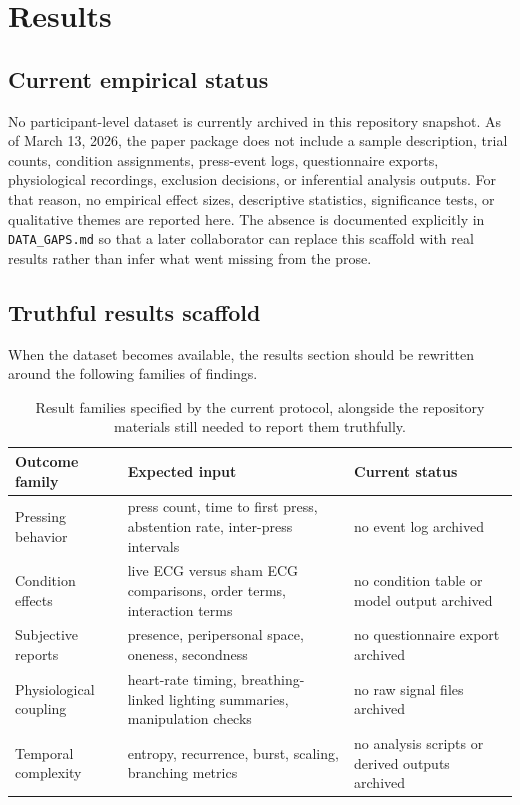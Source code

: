 \section{Results}

\subsection{Current empirical status}

No participant-level dataset is currently archived in this repository snapshot. As of March 13, 2026, the paper package does not include a sample description, trial counts, condition assignments, press-event logs, questionnaire exports, physiological recordings, exclusion decisions, or inferential analysis outputs. For that reason, no empirical effect sizes, descriptive statistics, significance tests, or qualitative themes are reported here. The absence is documented explicitly in \texttt{DATA\_GAPS.md} so that a later collaborator can replace this scaffold with real results rather than infer what went missing from the prose.

\subsection{Truthful results scaffold}

When the dataset becomes available, the results section should be rewritten around the following families of findings.

\begin{table}[t]
\centering
\begin{tabular}{|p{3.3cm}|p{4.6cm}|p{5.2cm}|}
\hline
\textbf{Outcome family} & \textbf{Expected input} & \textbf{Current status} \\
\hline
Pressing behavior & press count, time to first press, abstention rate, inter-press intervals & no event log archived \\
\hline
Condition effects & live ECG versus sham ECG comparisons, order terms, interaction terms & no condition table or model output archived \\
\hline
Subjective reports & presence, peripersonal space, oneness, secondness & no questionnaire export archived \\
\hline
Physiological coupling & heart-rate timing, breathing-linked lighting summaries, manipulation checks & no raw signal files archived \\
\hline
Temporal complexity & entropy, recurrence, burst, scaling, branching metrics & no analysis scripts or derived outputs archived \\
\hline
\end{tabular}
\caption{Result families specified by the current protocol, alongside the repository materials still needed to report them truthfully.}
\end{table}

